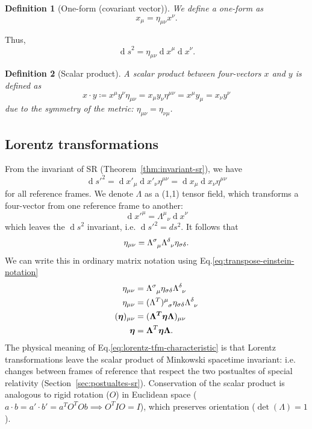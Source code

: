 \documentclass[11pt]{article}
\numberwithin{equation}{section}
\newcommand{\defeq}{\coloneqq}
\renewcommand{\d}[1]{\ensuremath{\operatorname{d}\!{#1}}}
\newtheorem{defn}{Definition}[section]
\newcommand{\bs}{\boldsymbol}
\begin{document}
\begin{defn}[One-form (covariant vector)]
We define a one-form as 
\begin{equation}
x_\mu = \eta_{\mu \nu}x^\nu.
\end{equation}
\end{defn} 
\noindent Thus,
\begin{equation}
\d s^2 = \eta_{\mu \nu} \d x^\mu \d x^\nu.
\end{equation}
\begin{defn}[Scalar product]
A scalar product between four-vectors $x$ and $y$ is defined as
\begin{equation}
x \cdot y \defeq x^\mu y^\nu \eta_{\mu \nu} = x_\mu y_\nu \eta^{\mu \nu} = x^\mu y_\mu = x_\nu y^\nu
\end{equation}
due to the symmetry of the metric: $\eta_{\mu \nu} = \eta_{\nu \mu}$.
\end{defn}



\subsection{Lorentz transformations}
From the invariant of SR (Theorem~\ref{thm:invariant-sr}), we have
\begin{equation}
\d s'^2 = \d x'_\mu \d x'_\nu \eta^{\mu \nu} = \d x_\mu \d x_\nu \eta^{\mu \nu}
\end{equation}
for all reference frames. We denote $\Lambda$ as a (1,1) tensor field, which transforms a four-vector from one reference frame to another:
\begin{equation}
\d x'^\mu = \Lambda^\mu{}_{\nu} \d x ^\nu
\end{equation}
which leaves the $\d s^2$ invariant, i.e. $\d s'^2 = ds^2$. It follows that 
\begin{equation}
\eta_{\mu \nu} = \tensor{\Lambda}{^\sigma_\mu} \tensor{\Lambda}{^\delta_\nu} \eta_{\sigma \delta}.  \label{eq:lorentz-tfm-characteristic}\\
\end{equation}
We can write this in ordinary matrix notation using Eq.\eqref{eq:transpose-einstein-notation}
\begin{align}
\eta_{\mu \nu} &= \tensor{\Lambda}{^\sigma_\mu}  \eta_{\sigma \delta} \tensor{\Lambda}{^\delta_\nu} \nonumber \\
\eta_{\mu \nu} &= \tensor{(\Lambda^T)}{^\mu_\sigma}  \eta_{\sigma \delta} \tensor{\Lambda}{^\delta_\nu} \nonumber \\
(\bs{\eta})_{\mu \nu} &= (\bs{\Lambda^T \eta \Lambda})_{\mu \nu} \nonumber \\
\bs{\eta} &= \bs{\Lambda}^T \bs{\eta \Lambda}. \nonumber
\end{align}
The physical meaning of Eq.\eqref{eq:lorentz-tfm-characteristic} is that Lorentz transformations leave the scalar product of Minkowski spacetime invariant: i.e. changes between frames of reference that respect the two postualtes of special relativity (Section~\ref{sec:postualtes-sr}). Conservation of the scalar product is analogous to rigid rotation ($O$) in Euclidean space ($a \cdot b = a' \cdot b' = a^T O^T O b \implies O^T I O = I$), which preserves orientation ($\det(\Lambda)=1$).
\end{document}

